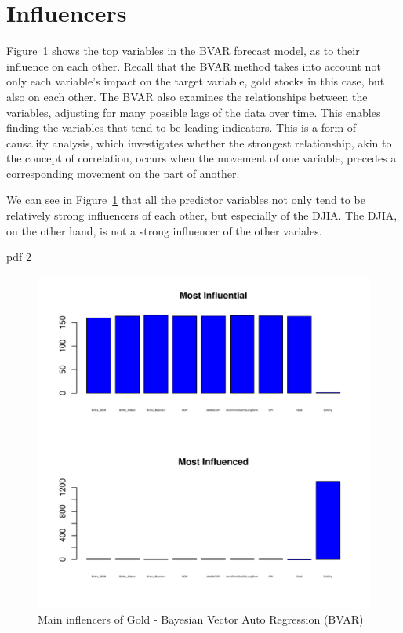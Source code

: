 \documentclass[12pt]{article}         %
\begin{document}
\section{Influencers}

Figure~\ref{fig:BVARInfluencers} shows the top variables in the BVAR forecast model, as to their influence on each other.  Recall that the BVAR method takes into account not only each variable's impact on the target variable, gold stocks in this case, but also on each other.  The BVAR also examines the relationships between the variables, adjusting for many possible lags of the data over time.  This enables finding the variables that tend to be leading indicators.  This is a form of causality analysis, which investigates whether the strongest relationship, akin to the concept of correlation, occurs when the movement of one variable, precedes a corresponding movement on the part of another.

We can see in Figure~\ref{fig:BVARInfluencers} that all the predictor variables not only tend to be relatively strong influencers of each other, but especially of the DJIA.  The DJIA, on the other hand, is not a strong influencer of the other variales.  


\begin{Schunk}
\begin{Soutput}
pdf 
  2 
\end{Soutput}
\end{Schunk}

\begin{figure}[h!]
\begin{center}
\includegraphics[width=\linewidth]{plots/Gold_barchart_not_whitened.pdf}
\caption{Main inflencers of Gold - Bayesian Vector Auto Regression (BVAR)}
\label{fig:BVARInfluencers}
\end{center}
\end{figure}
\end{document}
